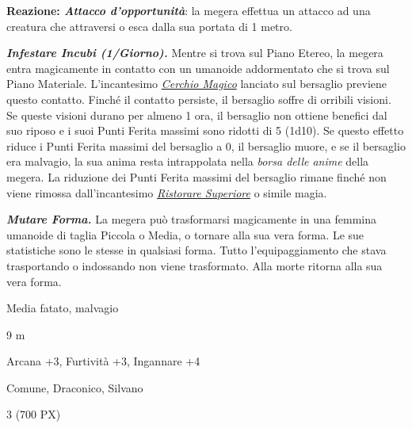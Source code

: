 \begin{multicols}{2}
{\textbf{Reazione: \emph{Attacco d'opportunità}}: la megera effettua un attacco ad una creatura che attraversi o esca dalla sua portata di 1 metro.

\emph{\textbf{Infestare Incubi (1/Giorno).}} Mentre si trova sul Piano Etereo, la megera entra magicamente in contatto con un umanoide addormentato che si trova sul Piano Materiale. L'incantesimo \emph{\hyperlink{Cerchio Magico}{Cerchio Magico}} lanciato sul bersaglio previene questo contatto. Finché il contatto persiste, il bersaglio soffre di orribili visioni. Se queste visioni durano per almeno 1 ora, il bersaglio non ottiene benefici dal suo riposo e i suoi Punti Ferita massimi sono ridotti di 5 (1d10). Se questo effetto riduce i Punti Ferita massimi del bersaglio a 0, il bersaglio muore, e se il bersaglio era malvagio, la sua anima resta intrappolata nella \emph{borsa delle anime} della megera. La riduzione dei Punti Ferita massimi del bersaglio rimane finché non viene rimossa dall'incantesimo \emph{\hyperlink{Ristorare Superiore}{Ristorare Superiore}} o simile magia.

\emph{\textbf{Mutare Forma.}} La megera può trasformarsi magicamente in una femmina umanoide di taglia Piccola o Media, o tornare alla sua vera forma. Le sue statistiche sono le stesse in qualsiasi forma. Tutto l'equipaggiamento che stava trasportando o indossando non viene trasformato. Alla morte ritorna alla sua vera forma.

\begin{description}[noitemsep, topsep=0pt, parsep=0pt, partopsep=0pt, itemsep=1pt, leftmargin=2.35cm,  labelwidth=2.2cm, itemindent=0cm, listparindent=0pt] %
\setlength{\baselineskip}{10pt}
\item[\textbf{Taglia/Tipo}] Media fatato, malvagio
\item[\textbf{Caratt.}] 
\item[\textbf{Punti Ferita}] 
\item[\textbf{Movimento}] 9 m
\item[\textbf{Tiri Salvez.}] 
\item[\textbf{Comp.}] Arcana +3, Furtività +3, Ingannare +4
\item[\textbf{Sensi}] 
\item[\textbf{Linguaggi}] Comune, Draconico, Silvano
\item[\textbf{Sfida}] 3 (700 PX)
\end{description}
\smallskip

}
\end{multicols}

